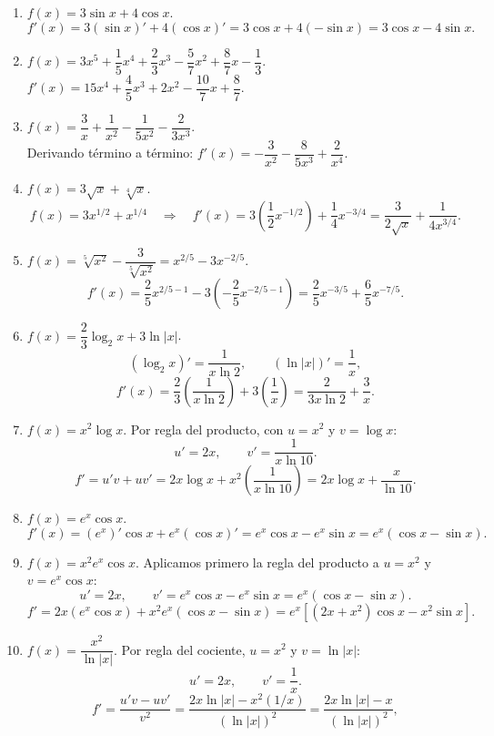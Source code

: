 \documentclass[12pt, letterpaper]{article}
\makeatletter
\renewcommand{\alph}[1]{\expandafter\@alphlatin\csname c@#1\endcsname}
\newcommand{\@alphlatin}[1]{\ifcase#1\or a\or b\or c\or d\or e\or f\or g\or h\or i\or j\or k\or l\or m\or n\or o\or p\or q\or r\or s\or t\or u\or v\or w\or x\or y\or z\else\@ctrerr\fi}
\makeatother
\begin{document}
\begin{enumerate}[label=\alph*)]
  \item $f(x)=3\sin x+4\cos x$.\\
  \[
  f'(x)=3(\sin x)'+4(\cos x)'
  =3\cos x+4(-\sin x)
  =\boxed{3\cos x-4\sin x}.
  \]
  \item $f(x)=3x^5+\dfrac15x^4+\dfrac23x^3-\dfrac57x^2+\dfrac87x-\dfrac13$.\\
  $\boxed{f'(x)=15x^4+\dfrac45x^3+2x^2-\dfrac{10}{7}x+\dfrac87}$.
  \item $f(x)=\dfrac3x+\dfrac1{x^2}-\dfrac1{5x^2}-\dfrac2{3x^3}$.\\
  Derivando término a término: $\boxed{f'(x)=-\dfrac3{x^2}-\dfrac8{5x^3}+\dfrac2{x^4}}$.
  \item $f(x)=3\sqrt{x}+\sqrt[4]{x}$.\\
  \[
  f(x)=3x^{1/2}+x^{1/4}
  \quad\Longrightarrow\quad
  f'(x)=3\left(\frac12x^{-1/2}\right)
  +\frac14x^{-3/4}
  =\boxed{\frac{3}{2\sqrt{x}}+\frac{1}{4x^{3/4}}}.
  \]
  \item $f(x)=\sqrt[5]{x^2}-\dfrac{3}{\sqrt[5]{x^2}}=x^{2/5}-3x^{-2/5}$.\\
  \[
  f'(x)=\frac25x^{2/5-1}-3\left(-\frac25x^{-2/5-1}\right)
  =\frac25x^{-3/5}+\frac65x^{-7/5}.
  \]
  \item $f(x)=\dfrac23\log_2x+3\ln|x|$.\\
  \[
  (\log_2x)'=\frac1{x\ln2},\qquad(\ln|x|)'=\frac1x,
  \]
  \[
  f'(x)=\frac23\left(\frac1{x\ln2}\right)+3\left(\frac1x\right)
  =\boxed{\frac{2}{3x\ln2}+\frac3x}.
  \]
  \item $f(x)=x^2\log x$. Por regla del producto, con $u=x^2$ y $v=\log x$:
  \[
  u'=2x,\qquad v'=\frac1{x\ln10}.
  \]
  \[
  f'=u'v+uv'
  =2x\log x+x^2\left(\frac1{x\ln10}\right)
  =\boxed{2x\log x+\frac{x}{\ln10}}.
  \]
  \item $f(x)=e^x\cos x$.\\
  \[
  f'(x)=(e^x)'\cos x+e^x(\cos x)'
  =e^x\cos x-e^x\sin x
  =\boxed{e^x(\cos x-\sin x)}.
  \]
  \item $f(x)=x^2e^x\cos x$. Aplicamos primero la regla del producto a $u=x^2$ y $v=e^x\cos x$:
  \[
  u'=2x,\qquad v'=e^x\cos x-e^x\sin x=e^x(\cos x-\sin x).
  \]
  \[
  f'=2x(e^x\cos x)+x^2e^x(\cos x-\sin x)
  =\boxed{e^x\left[(2x+x^2)\cos x-x^2\sin x\right]}.
  \]
  \item $f(x)=\dfrac{x^2}{\ln|x|}$. Por regla del cociente, $u=x^2$ y $v=\ln|x|$:
  \[
  u'=2x,\qquad v'= \frac1x.
  \]
  \[
  f'=\frac{u'v-uv'}{v^2}
  =\frac{2x\ln|x|-x^2(1/x)}{(\ln|x|)^2}
  =\boxed{\frac{2x\ln|x|-x}{(\ln|x|)^2}},
\]
\end{enumerate}
\end{document}
